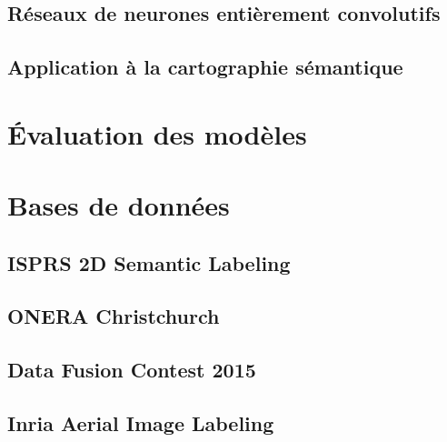 \subsection{Réseaux de neurones entièrement convolutifs}

\subsection{Application à la cartographie sémantique}

\section{Évaluation des modèles}

\section{Bases de données}

\subsection{ISPRS 2D Semantic Labeling}

\subsection{ONERA Christchurch}

\subsection{Data Fusion Contest 2015}

\subsection{Inria Aerial Image Labeling}
	


